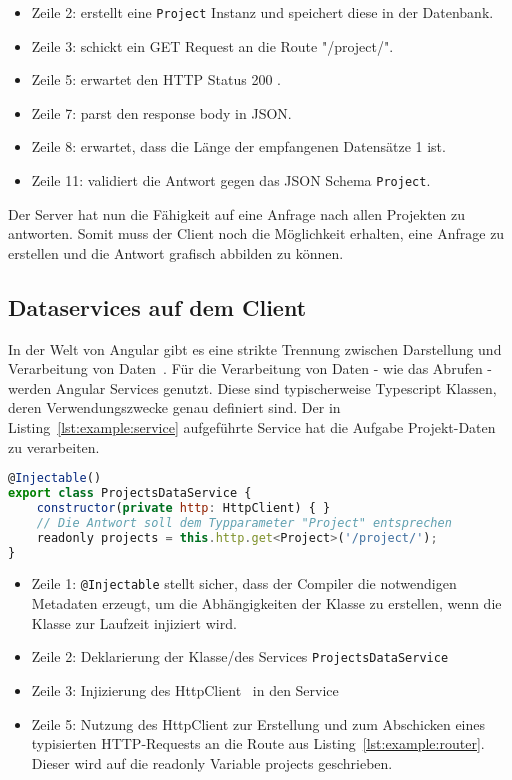 \begin{itemize}
	\setlength\itemsep{-1em}
	\item Zeile 2: erstellt eine \texttt{Project} Instanz und speichert diese in der Datenbank.
	\item Zeile 3: schickt ein GET Request an die Route "/project/".
	\item Zeile 5: erwartet den HTTP Status 200 . 
	\item Zeile 7: parst den response body in JSON.
	\item Zeile 8: erwartet, dass die Länge der empfangenen Datensätze 1 ist.
	\item Zeile 11: validiert die Antwort gegen das JSON Schema \texttt{Project}.
\end{itemize}

Der Server hat nun die Fähigkeit auf eine Anfrage nach allen Projekten zu antworten.
Somit muss der Client noch die Möglichkeit erhalten, eine Anfrage zu erstellen und die Antwort grafisch abbilden zu können.

\subsection{Dataservices auf dem Client}
\label{sec:requirements:example:service}
In der Welt von Angular gibt es eine strikte Trennung zwischen Darstellung und Verarbeitung von Daten~\cite{angular-service}.
Für die Verarbeitung von Daten - wie das Abrufen - werden Angular Services genutzt. Diese sind typischerweise Typescript Klassen,
deren Verwendungszwecke genau definiert sind. Der in Listing~\ref{lst:example:service} aufgeführte Service hat die Aufgabe Projekt-Daten zu verarbeiten.

\begin{lstlisting}[language=JavaScript,float=h!,caption={Funktion zum Abruf aller Projekte vom Server}, label={lst:example:service}]
@Injectable()
export class ProjectsDataService {
    constructor(private http: HttpClient) { }
    // Die Antwort soll dem Typparameter "Project" entsprechen
    readonly projects = this.http.get<Project>('/project/');
}
\end{lstlisting}

\begin{itemize}
    \setlength\itemsep{-1em}
    \item Zeile 1: \texttt{@Injectable} stellt sicher, dass der Compiler die notwendigen Metadaten erzeugt, um die Abhängigkeiten der Klasse zu erstellen, wenn die Klasse zur Laufzeit injiziert wird.
    \item Zeile 2: Deklarierung der Klasse/des Services \texttt{ProjectsDataService}
    \item Zeile 3: Injizierung des HttpClient~\cite{angular-http} in den Service
    \item Zeile 5: Nutzung des HttpClient zur Erstellung und zum Abschicken eines typisierten HTTP-Requests an die Route aus Listing~\ref{lst:example:router}.
    Dieser wird auf die readonly Variable projects geschrieben.
\end{itemize}

